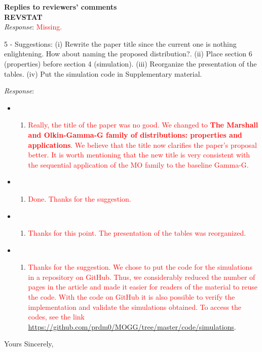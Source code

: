 \documentclass[version=last,12pt,{"maintainersDelight"}]{scrlttr2}
\providecommand{\tightlist}{%
  \setlength{\itemsep}{0pt}\setlength{\parskip}{0pt}}
\begin{document}
\begin{letter}{\textbf{Replies to reviewers' comments}\\\textbf{REVSTAT}\\}
\emph{Response}: \textcolor{red}{Missing.}


5 - Suggestions: (i) Rewrite the paper title since the current one is nothing enlightening. How about naming the proposed distribution?. (ii) Place section 6 (properties) before section 4 (simulation). (iii) Reorganize the presentation of the tables. (iv) Put the simulation code in Supplementary material.

\emph{Response}:

\begin{itemize}
\item
  \begin{enumerate}
  \def\labelenumi{(\roman{enumi})}
  \tightlist
  \item
    \textcolor{red}{Really, the title of the paper was no good. We changed to \textbf{The Marshall and Olkin-Gamma-G family of distributions: properties and applications}. We believe that the title now clarifies the paper's proposal better. It is worth mentioning that the new title is very consistent with the sequential application of the MO family to the baseline Gamma-G.}
  \end{enumerate}
\item
  \begin{enumerate}
  \def\labelenumi{(\roman{enumi})}
  \setcounter{enumi}{1}
  \tightlist
  \item
    \textcolor{red}{Done. Thanks for the suggestion.}
  \end{enumerate}
\item
  \begin{enumerate}
  \def\labelenumi{(\roman{enumi})}
  \setcounter{enumi}{2}
  \tightlist
  \item
    \textcolor{red}{Thanks for this point. The presentation of the tables was reorganized.}
  \end{enumerate}
\item
  \begin{enumerate}
  \def\labelenumi{(\roman{enumi})}
  \setcounter{enumi}{3}
  \tightlist
  \item
    \textcolor{red}{Thanks for the suggestion. We chose to put the code for the simulations in a repository on GitHub. Thus, we considerably reduced the number of pages in the article and made it easier for readers of the material to reuse the code. With the code on GitHub it is also possible to verify the implementation and validate the simulations obtained. To access the codes, see the link 
    \url{https://github.com/prdm0/MOGG/tree/master/code/simulations}}.
  \end{enumerate}
\end{itemize}

\closing{Yours Sincerely,}




 \end{letter}
\end{document}
